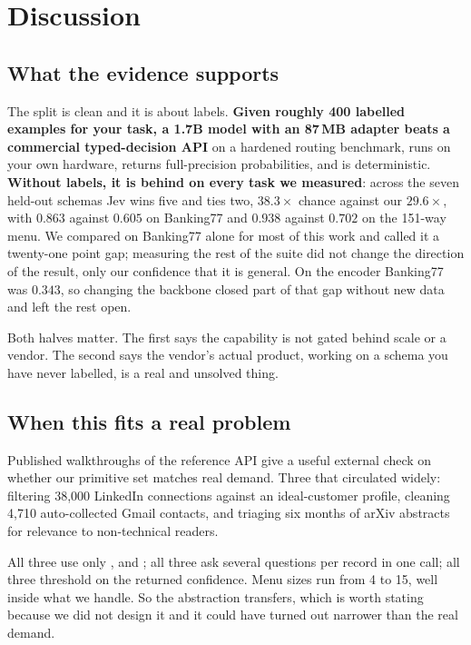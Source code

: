 \section{Discussion}
\label{sec:discussion}

\subsection{What the evidence supports}

The split is clean and it is about labels. \textbf{Given roughly 400
labelled examples for your task, a 1.7B model with an 87\,MB adapter beats
a commercial typed-decision API} on a hardened routing benchmark, runs on
your own hardware, returns full-precision probabilities, and is
deterministic. \textbf{Without labels, it is behind on every task we
measured}: across the seven held-out schemas Jev wins five and ties two,
$38.3\times$ chance against our $29.6\times$, with $0.863$ against
$0.605$ on Banking77 and $0.938$ against $0.702$ on the 151-way menu. We
compared on Banking77 alone for most of this work and called it a
twenty-one point gap; measuring the rest of the suite did not change the
direction of the result, only our confidence that it is general. On the
encoder Banking77 was $0.343$, so changing the backbone closed part of
that gap without new data and left the rest open.

Both halves matter. The first says the capability is not gated behind
scale or a vendor. The second says the vendor's actual product, working
on a schema you have never labelled, is a real and unsolved thing.

\subsection{When this fits a real problem}
\label{sec:when}

Published walkthroughs of the reference API give a useful external check
on whether our primitive set matches real demand. Three that circulated
widely: filtering 38{,}000 LinkedIn connections against an ideal-customer
profile, cleaning 4{,}710 auto-collected Gmail contacts, and triaging six
months of arXiv abstracts for relevance to non-technical readers.

All three use only \choice{}, \score{} and \noul{}; all three ask several
questions per record in one call; all three threshold on the returned
confidence. Menu sizes run from 4 to 15, well inside what we handle. So
the abstraction transfers, which is worth stating because we did not
design it and it could have turned out narrower than the real demand.

